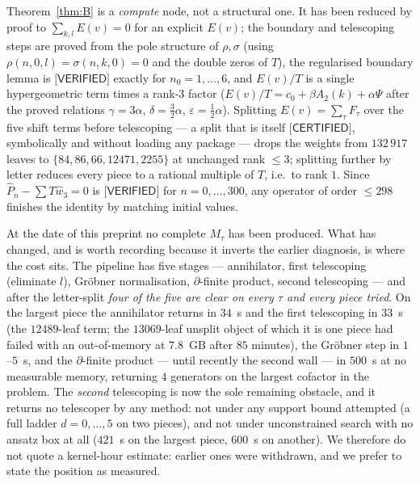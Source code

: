 \documentclass[11pt,reqno]{amsart}
\theoremstyle{plain}
\theoremstyle{definition}
\theoremstyle{remark}
\numberwithin{equation}{section}
\newcommand{\wthree}{\hat w_3}
\newcommand{\VERIFIED}{\textsf{[VERIFIED]}}
\newcommand{\CERTIFIED}{\textsf{[CERTIFIED]}}
\begin{document}
Theorem~\ref{thm:B} is a \emph{compute} node, not a structural one. It has been reduced by proof
to $\sum_{k,l}E(v)=0$ for an explicit $E(v)$; the boundary and telescoping steps are proved from
the pole structure of $\rho,\sigma$ (using $\rho(n,0,l)=\sigma(n,k,0)=0$ and the double zeros of
$T$), the regularised boundary lemma is $\VERIFIED$ exactly for $n_0=1,\dots,6$, and $E(v)/T$ is
a single hypergeometric term times a rank-$3$ factor ($E(v)/T=c_0+\beta A_2(k)+\alpha\Psi$ after
the proved relations $\gamma=3\alpha$, $\delta=\tfrac32\alpha$, $\varepsilon=\tfrac12\alpha$).
Splitting $E(v)=\sum_\tau F_\tau$ over the five shift terms before telescoping --- a split that
is itself $\CERTIFIED$, symbolically and without loading any package --- drops the weights from
$132\,917$ leaves to $\{84,86,66,12471,2255\}$ at unchanged rank $\le3$; splitting further by
letter reduces every piece to a rational multiple of $T$, i.e.\ to rank $1$. Since
$\hat P_n-\sum T\wthree=0$ is $\VERIFIED$ for $n=0,\dots,300$, any operator of order $\le298$
finishes the identity by matching initial values.

At the date of this preprint no complete $M_\tau$ has been produced. What has changed, and is
worth recording because it inverts the earlier diagnosis, is where the cost sits. The pipeline
has five stages --- annihilator, first telescoping (eliminate $l$), Gr\"obner normalisation,
$\partial$-finite product, second telescoping --- and after the letter-split \emph{four of the
five are clear on every $\tau$ and every piece tried}. On the largest piece the annihilator
returns in $34$~s and the first telescoping in $33$~s (the $12489$-leaf term; the $13069$-leaf
unsplit object of which it is one piece had failed with an out-of-memory at $7.8$~GB after $85$
minutes), the Gr\"obner step in $1$--$5$~s, and the $\partial$-finite product --- until recently
the second wall --- in $500$~s at no measurable memory, returning $4$ generators on the largest
cofactor in the problem. The \emph{second} telescoping is now the sole remaining obstacle, and it
returns no telescoper by any method: not under any support bound attempted (a full ladder
$d=0,\dots,5$ on two pieces), and not under unconstrained search with no ansatz box at all
($421$~s on the largest piece, $600$~s on another). We therefore do not quote a kernel-hour
estimate: earlier ones were withdrawn, and we prefer to state the position as measured.
\end{document}
